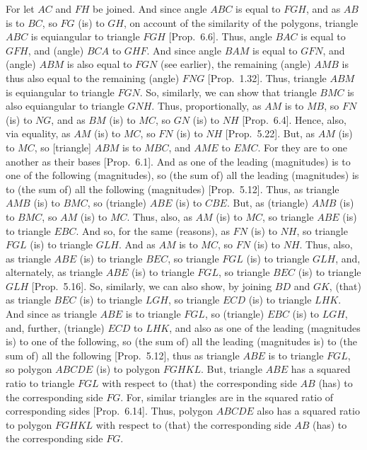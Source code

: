 \begin{Parallel}{}{}
{For let $AC$ and $FH$ be joined. And since angle $ABC$ is
equal to $FGH$,  and
as $AB$ is to $BC$, so $FG$ (is) to $GH$, on account of the similarity of the polygons,  triangle $ABC$ is equiangular to triangle
$FGH$ [Prop.~6.6]. Thus, angle $BAC$ is equal 
to $GFH$, and (angle) $BCA$ to $GHF$. And since angle $BAM$ is equal to 
$GFN$, and (angle) $ABM$ is also equal to $FGN$ (see earlier), the remaining (angle) $AMB$ is
thus also equal to the remaining (angle) $FNG$  [Prop.~1.32]. 
Thus, triangle $ABM$ is equiangular to triangle $FGN$. So, similarly, we can
show that triangle $BMC$ is also equiangular to triangle $GNH$. Thus, proportionally,
as $AM$ is to $MB$, so $FN$ (is) to $NG$, and as $BM$ (is) to $MC$, so $GN$ (is) to
$NH$ [Prop.~6.4]. Hence, also, via equality,
as $AM$ (is) to $MC$, so $FN$ (is) to $NH$ 
[Prop.~5.22]. But, as $AM$ (is) to $MC$,
so [triangle] $ABM$ is to $MBC$, and $AME$ to $EMC$. For they are to one another
 as their bases  [Prop.~6.1]. And as one
 of the leading (magnitudes) is to one of the following (magnitudes), so
    (the sum of) all the leading (magnitudes) is to (the sum of) all the following (magnitudes)
[Prop.~5.12]. Thus, as triangle $AMB$
 (is) to $BMC$, so (triangle) $ABE$ (is) to $CBE$. But, as (triangle) $AMB$ (is) to
 $BMC$, so $AM$ (is) to $MC$. Thus, also, as $AM$ (is) to $MC$, so 
triangle $ABE$
 (is) to triangle $EBC$. And so, for the same (reasons), as $FN$ (is) to $NH$,
 so triangle $FGL$  (is) to triangle $GLH$. And as $AM$ is to $MC$, so $FN$ (is) to
 $NH$. Thus, also, as triangle $ABE$ (is) to triangle $BEC$, so triangle $FGL$
 (is) to triangle $GLH$, and, alternately, as triangle $ABE$ (is) to triangle
 $FGL$, so triangle $BEC$ (is) to triangle $GLH$  [Prop.~5.16]. So, similarly, we can also show, by
 joining $BD$ and $GK$, (that)  as triangle $BEC$ (is) to triangle $LGH$,
 so triangle $ECD$ (is) to triangle $LHK$. And since as triangle $ABE$ is
 to triangle $FGL$, so (triangle) $EBC$ (is) to $LGH$, and, further, (triangle)
 $ECD$ to $LHK$, and also as one of the leading (magnitudes is) to one
 of the following, so (the sum of) all the leading (magnitudes is) to (the sum of) all the
 following [Prop.~5.12], thus as triangle
 $ABE$ is to triangle $FGL$, so polygon $ABCDE$ (is) to polygon
 $FGHKL$. But, triangle $ABE$ has a squared ratio to triangle $FGL$ with
 respect to (that) the corresponding side $AB$ (has) to the corresponding side
 $FG$. For, similar triangles are in the squared ratio of corresponding sides 
[Prop.~6.14]. Thus, polygon
$ABCDE$ also has a squared ratio to polygon $FGHKL$ with respect to
(that) the corresponding side $AB$ (has) to the corresponding side
$FG$.

}
\end{Parallel}
